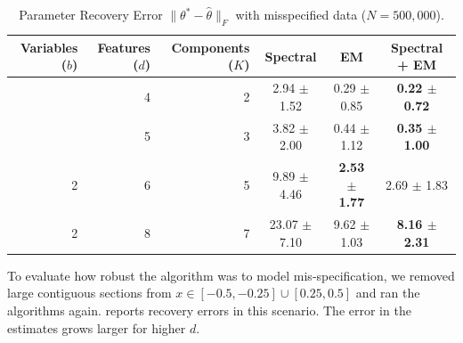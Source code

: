 \begin{table}[tb]
\caption{Parameter Recovery Error $\|\theta^* - \hat \theta\|_F$ with misspecified data ($N = 500,000$).}
\label{tbl:parameter-recovery-mis}
\vskip 0.15in
\begin{center}
\begin{small}
\begin{sc}

  \begin{tabular}{ r r r c c c }
\hline
\abovespace\belowspace
Variables ($b$) & Features ($d$) & Components ($K$) & Spectral & EM & Spectral + EM \\
\hline
\abovespace
 1 & 4 & 2 &  2.94 $\pm$ 1.52 & 0.29 $\pm$ 0.85 &  {\bf 0.22 $\pm$ 0.72} \\
\belowspace
 2 & 5 & 3 &  3.82 $\pm$ 2.00 & 0.44 $\pm$ 1.12 &  {\bf 0.35 $\pm$ 1.00} \\
 2 & 6 & 5 &  9.89 $\pm$ 4.46 & {\bf 2.53 $\pm$ 1.77} &  2.69 $\pm$ 1.83 \\
 2 & 8 & 7 & 23.07 $\pm$ 7.10 & 9.62 $\pm$ 1.03 &  {\bf 8.16 $\pm$ 2.31}  \\
\hline

\end{tabular}
\end{sc}
\end{small}
\end{center}
\vskip -0.1in
\end{table}

To evaluate how robust the algorithm was to model mis-specification, we
removed large contiguous sections from $x \in [-0.5,-0.25] \cup
[0.25,0.5]$ and ran the algorithms again.
 reports recovery errors in this
scenario. The error in the estimates grows larger for higher $d$.

